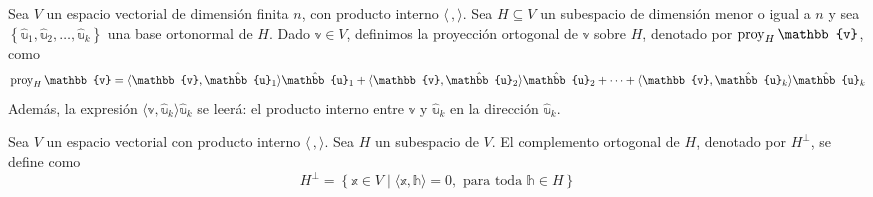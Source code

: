 \begin{definition}
    Sea $V$ un espacio vectorial de dimensión finita $n$, con producto interno $\langle \, , \rangle$. Sea $H \subseteq V$ un subespacio de dimensión menor o igual a $n$ y sea $\left\{ \hat{\mathbb{u}}_1, \hat{\mathbb{u}}_2, \dots, \hat{\mathbb{u}}_k \right\}$ una base ortonormal de $H$. Dado $\mathbb{v} \in V$, definimos la proyección ortogonal de $\mathbb{v}$ sobre $H$, denotado por $\proy_{H} \mathbb{v}$, como
    $$\proy_{H} \mathbb{v} = \langle \mathbb{v}, \hat{\mathbb{u}}_1 \rangle \hat{\mathbb{u}}_1 + \langle \mathbb{v}, \hat{\mathbb{u}}_2 \rangle \hat{\mathbb{u}}_2 + \cdots + \langle \mathbb{v}, \hat{\mathbb{u}}_k \rangle \hat{\mathbb{u}}_k$$
    Además, la expresión $\langle \mathbb{v}, \hat{\mathbb{u}}_k \rangle \hat{\mathbb{u}}_k$ se leerá: el producto interno entre $\mathbb{v}$ y $\hat{\mathbb{u}}_k$ en la dirección $\hat{\mathbb{u}}_k$.
\end{definition}

\begin{definition}
    Sea $V$ un espacio vectorial con producto interno $\langle \, , \rangle$. Sea $H$ un subespacio de $V$. El complemento ortogonal de $H$, denotado por $H^{\bot}$, se define como
    $$H^{\bot} = \left\{ \mathbb{x} \in V \mid \langle \mathbb{x}, \mathbb{h} \rangle = 0, \text{ para toda } \mathbb{h} \in H \right\}$$
\end{definition}

